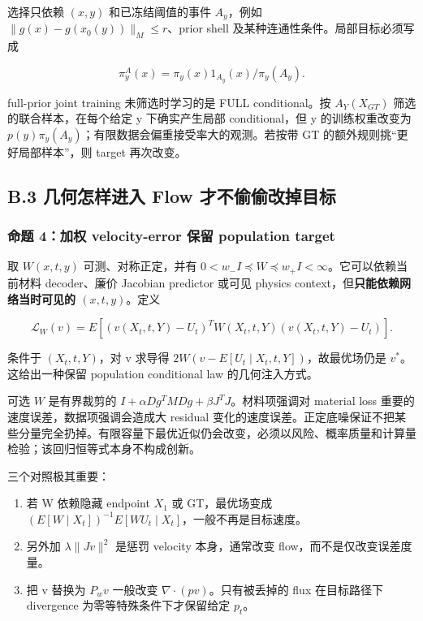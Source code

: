 \documentclass[
  11pt,
  a4paper,
]{article}
\providecommand{\tightlist}{%
  \setlength{\itemsep}{0pt}\setlength{\parskip}{0pt}}
\begin{document}
选择只依赖 \((x,y)\) 和已冻结阈值的事件 \(A_y\)，例如
\(\|g(x)-g(x_0(y))\|_M\le r\)、prior shell
及某种连通性条件。局部目标必须写成

\[
\pi_y^{A}(x)=\pi_y(x)1_{A_y}(x)/\pi_y(A_y).
\]

full-prior joint training 未筛选时学习的是 FULL conditional。按
\(A_Y(X_{GT})\) 筛选的联合样本，在每个给定 y 下确实产生局部
conditional，但 y 的训练权重改变为
\(p(y)\pi_y(A_y)\)；有限数据会偏重接受率大的观测。若按带 GT
的额外规则挑``更好局部样本''，则 target 再次改变。

\hypertarget{b.3-ux51e0ux4f55ux600eux6837ux8fdbux5165-flow-ux624dux4e0dux5077ux5077ux6539ux6389ux76eeux6807}{%
\subsection{B.3 几何怎样进入 Flow
才不偷偷改掉目标}\label{b.3-ux51e0ux4f55ux600eux6837ux8fdbux5165-flow-ux624dux4e0dux5077ux5077ux6539ux6389ux76eeux6807}}

\hypertarget{ux547dux9898-4ux52a0ux6743-velocity-error-ux4fddux7559-population-target}{%
\subsubsection{命题 4：加权 velocity-error 保留 population
target}\label{ux547dux9898-4ux52a0ux6743-velocity-error-ux4fddux7559-population-target}}

取 \(W(x,t,y)\) 可测、对称正定，并有
\(0<w_-I\preceq W\preceq w_+I<\infty\)。它可以依赖当前材料 decoder、廉价
Jacobian predictor 或可见 physics
context，但\textbf{只能依赖网络当时可见的 \((x,t,y)\)}。定义

\[
\mathcal{L}_W(v)=E[(v(X_t,t,Y)-U_t)^T W(X_t,t,Y)(v(X_t,t,Y)-U_t)].
\]

条件于 \((X_t,t,Y)\)，对 v 求导得
\(2W(v-E[U_t\mid X_t,t,Y])\)，故最优场仍是 \(v^*\)。这给出一种保留
population conditional law 的几何注入方式。

可选 \(W\) 是有界裁剪的 \(I+\alpha Dg^TMDg+\beta J^TJ\)。材料项强调对
material loss 重要的速度误差，数据项强调会造成大 residual
变化的速度误差。正定底噪保证不把某些分量完全扔掉。有限容量下最优近似仍会改变，必须以风险、概率质量和计算量检验；该回归恒等式本身不构成创新。

三个对照极其重要：

\begin{enumerate}
\def\labelenumi{\arabic{enumi}.}
\tightlist
\item
  若 W 依赖隐藏 endpoint \(X_1\) 或 GT，最优场变成
  \((E[W\mid X_t])^{-1}E[WU_t\mid X_t]\)，一般不再是目标速度。
\item
  另外加 \(\lambda\|Jv\|^2\) 是惩罚 velocity 本身，通常改变
  flow，而不是仅改变误差度量。
\item
  把 v 替换为 \(P_wv\) 一般改变 \(\nabla\cdot(pv)\)。只有被丢掉的 flux
  在目标路径下 divergence 为零等特殊条件下才保留给定 \(p_t\)。
\end{enumerate}
\end{document}
